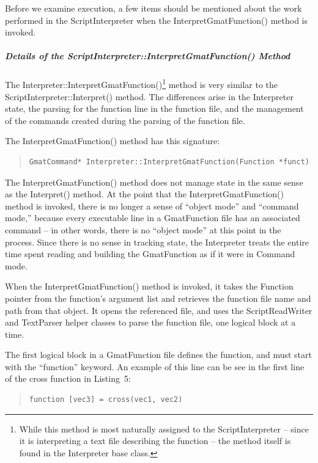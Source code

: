 Before we examine execution, a few items should be mentioned about the work performed in the
ScriptInterpreter when the InterpretGmatFunction() method is invoked.

\subparagraph{Details of the  ScriptInterpreter::InterpretGmatFunction() Method} The
Interpreter::Interpret\-GmatFunction()\footnote{While this method is most naturally assigned to the
ScriptInterpreter -- since it is interpreting a text file describing the function -- the method
itself is found in the Interpreter base class.} method is very similar to the
ScriptInterpreter::Interpret() method.  The differences arise in the Interpreter state, the parsing
for the function line in the function file, and the management of the commands created during the
parsing of the function file.

The InterpretGmatFunction() method has this signature:

\begin{quote}
\begin{verbatim}
GmatCommand* Interpreter::InterpretGmatFunction(Function *funct)
\end{verbatim}
\end{quote}

The InterpretGmatFunction() method does not manage state in the same sense as the Interpret()
method.  At the point that the InterpretGmatFunction() method is invoked, there is no longer a sense
of ``object mode'' and ``command mode,'' because every executable line in a GmatFunction file has an
associated command -- in other words, there is no ``object mode'' at this point in the process.
Since there is no sense in tracking state, the Interpreter treats the entire time spent reading and
building the GmatFunction as if it were in Command mode.

When the  InterpretGmatFunction() method is invoked, it takes the Function pointer from the
function's argument list and retrieves the function file name and path from that object.  It opens
the referenced file, and uses the ScriptReadWriter and TextParser helper classes to parse the
function file, one logical block at a time.

The first logical block in a GmatFunction file defines the function, and must start with the
``function'' keyword.  An example of this line can be see in the first line of the cross function in
Listing~5:

\begin{quote}
\begin{verbatim}
function [vec3] = cross(vec1, vec2)
\end{verbatim}
\end{quote}

